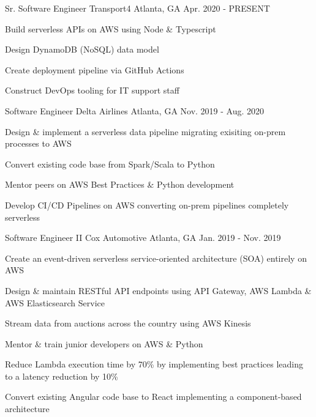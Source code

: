 
\begin{cventries}
  \cventry
    {Sr. Software Engineer} %
    {Transport4} %
    {Atlanta, GA} %
    {Apr. 2020 - PRESENT} %
    {
      \begin{cvitems} %
        \item {Build serverless APIs on AWS using Node \& Typescript}
        \item {Design DynamoDB (NoSQL) data model}
        \item {Create deployment pipeline via GitHub Actions}
        \item {Construct DevOps tooling for IT support staff}
      \end{cvitems}
    }
    
  \cventry
    {Software Engineer} %
    {Delta Airlines} %
    {Atlanta, GA} %
    {Nov. 2019 - Aug. 2020} %
    {
      \begin{cvitems} %
        \item {Design \& implement a serverless data pipeline migrating exisiting on-prem processes to AWS}
        \item {Convert existing code base from Spark/Scala to Python}
        \item {Mentor peers on AWS Best Practices \& Python development}
        \item {Develop CI/CD Pipelines on AWS converting on-prem pipelines completely serverless}
      \end{cvitems}
    }

  \cventry
    {Software Engineer II} %
    {Cox Automotive} %
    {Atlanta, GA} %
    {Jan. 2019 - Nov. 2019} %
    {
      \begin{cvitems} %
        \item {Create an event-driven serverless service-oriented architecture (SOA) entirely on AWS}
        \item {Design \& maintain RESTful API endpoints using API Gateway, AWS Lambda \& AWS Elasticsearch Service}
        \item {Stream data from auctions across the country using AWS Kinesis}
        \item {Mentor \& train junior developers on AWS \& Python}
        \item {Reduce Lambda execution time by 70\% by implementing best practices leading to a latency reduction by 10\%}
        \item {Convert existing Angular code base to React implementing a component-based architecture}
      \end{cvitems}
    }


\end{cventries}
